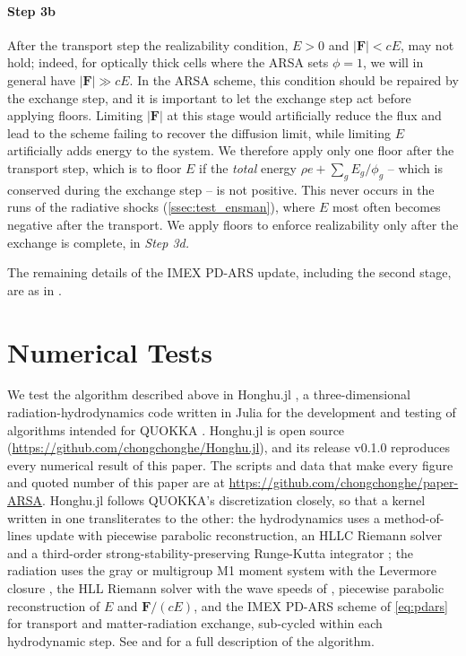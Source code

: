 \documentclass[preprint,12pt,authoryear]{elsarticle}
\newcommand{\vecF}{\mathbf{F}}
\begin{document}
\paragraph{Step 3b} After the transport step the realizability condition, $E > 0$ and $|\vecF| < cE$, may not hold; indeed, for optically thick cells where the ARSA sets $\phi = 1$, we will in general have $|\vecF| \gg cE$. In the ARSA scheme, this condition should be repaired by the exchange step, and it is important to let the exchange step act before applying floors. Limiting $|\vecF|$ at this stage would artificially reduce the flux and lead to the scheme failing to recover the diffusion limit, while limiting $E$ artificially adds energy to the system. We therefore apply only one floor after the transport step, which is to floor $E$ if the \emph{total} energy $\rho e + \sum_g E_g/\phi_g$ -- which is conserved during the exchange step -- is not positive. This never occurs in the runs of the radiative shocks (\autoref{ssec:test_ensman}), where $E$ most often becomes negative after the transport. We apply floors to enforce realizability only after the exchange is complete, in \emph{Step 3d.}

The remaining details of the IMEX PD-ARS update, including the second stage, are as in \citet{He24a}.

\section{Numerical Tests}
\label{sec:tests}

We test the algorithm described above in Honghu.jl \citep{He26a}, a three-dimensional radiation-hydrodynamics code written in Julia for the development and testing of algorithms intended for QUOKKA \citep{Wibking22a, He24a, He24b}. Honghu.jl is open source (\url{https://github.com/chongchonghe/Honghu.jl}), and its release v0.1.0 reproduces every numerical result of this paper. The scripts and data that make every figure and quoted number of this paper are at \url{https://github.com/chongchonghe/paper-ARSA}. Honghu.jl follows QUOKKA's discretization closely, so that a kernel written in one transliterates to the other: the hydrodynamics uses a method-of-lines update with piecewise parabolic reconstruction, an HLLC Riemann solver and a third-order strong-stability-preserving Runge-Kutta integrator \citep{Shu88a}; the radiation uses the gray or multigroup M1 moment system with the Levermore closure \citep{Levermore84a}, the HLL Riemann solver with the wave speeds of \citet{Balsara_1999}, piecewise parabolic reconstruction of $E$ and $\vecF/(cE)$, and the IMEX PD-ARS scheme of \autoref{eq:pdars} for transport and matter-radiation exchange, sub-cycled within each hydrodynamic step. See \citet{Wibking22a} and \citet{He24b, He24a} for a full description of the algorithm.
\end{document}
